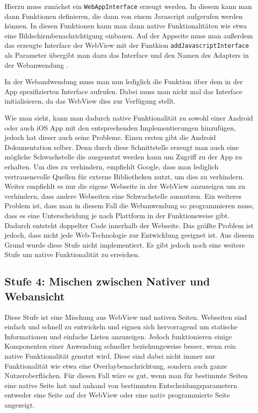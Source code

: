 Hierzu muss zunächst ein \verb|WebAppInterface| erzeugt werden. In diesem kann man dann Funktionen definieren, die dann von einem Javascript aufgerufen werden können. In diesen Funktionen kann man dann native Funktionalitäten wie etwa eine Bildschirmbenachrichtigung einbauen. Auf der Appseite muss man außerdem das erzeugte Interface der WebView mit der Funtkion \verb|addJavascriptInterface| als Parameter übergibt man dazu das Interface und den Namen des Adapters in der Webanwendung \cite{JavaScript_android_webview}.

In der Webandwendung muss man nun lediglich die Funktion über dem in der App spezifizierten Interface aufrufen. Dabei muss man nicht mal das Interface initialisieren, da das WebView dies zur Verfügung stellt.

Wie man sieht, kann man dadurch native Funktionalität zu sowohl einer Android oder auch iOS App mit den entsprechenden Implementierungen hinzufügen, jedoch hat dieser auch seine Probleme. Einen ersten gibt die Android Dokumentation selber. Denn durch diese Schnittstelle erzeugt man auch eine mögliche Schwachstelle die ausgenutzt werden kann um Zugriff zu der App zu erhalten. Um dies zu verhindern, empfiehlt Google, dass man lediglich vertrauensvolle Quellen für externe Bibliotheken nutzt, um dies zu verhindern. Weiter empfiehlt es nur die eigene Webseite in der WebView anzuzeigen um zu verhindern, dass andere Webseiten eine Schwachstelle ausnutzen.\cite{JavaScript_android_webview}  Ein weiteres Problem ist, dass man in diesem Fall die Webanwendung so programmieren muss, dass es eine Unterscheidung je nach Plattform in der Funktionsweise gibt. Dadurch entsteht doppelter Code innerhalb der Webseite. Das größte Problem ist jedoch, dass nicht jede Web-Technologie zur Entwicklung geeignet ist. Aus diesem Grund wurde diese Stufe nicht implementiert. Es gibt jedoch noch eine weitere Stufe um native Funktionalität zu erreichen.

\subsection{Stufe 4: Mischen zwischen Nativer und Webansicht}
Diese Stufe ist eine Mischung aus WebView und nativen Seiten. Webseiten sind einfach und schnell zu entwickeln und eignen sich hervorragend um statische Informationen und einfache Listen anzuzeigen. Jedoch funktionieren einige Komponenten einer Anwendung schneller beziehungsweise besser, wenn rein native Funktionalität genutzt wird. 
Diese sind dabei nicht immer nur Funktionalität wie etwa eine Overlaybenachrichtung, sondern auch ganze Nutzeroberflächen. Für diesen Fall wäre es gut, wenn man für bestimmte Seiten eine native Seite hat und anhand von bestimmten Entscheidungsparametern entweder eine Seite auf der WebView oder eine nativ programmierte Seite angezeigt.

